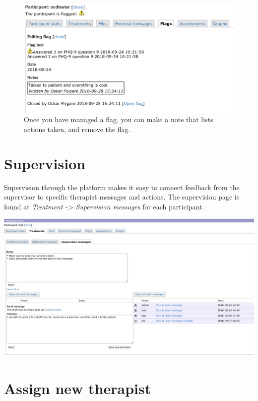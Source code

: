 \documentclass[]{book}
\theoremstyle{definition}
\theoremstyle{definition}
\theoremstyle{definition}
\theoremstyle{remark}
\begin{document}
\begin{figure}
\centering
\includegraphics{images/remove-flag.png}
\caption{Once you have managed a flag, you can make a note that lists
actions taken, and remove the flag.}
\end{figure}

\hypertarget{supervision}{%
\section{Supervision}\label{supervision}}

Supervision through the platform makes it easy to connect feedback from
the supervisor to specific therapist messages and actions. The
supervision page is found at \emph{Treatment -\textgreater{} Supervision
messages} for each participant.

\includegraphics{images/supervision.png}

\hypertarget{assign-new-therapist}{%
\section{Assign new therapist}\label{assign-new-therapist}}
\end{document}
